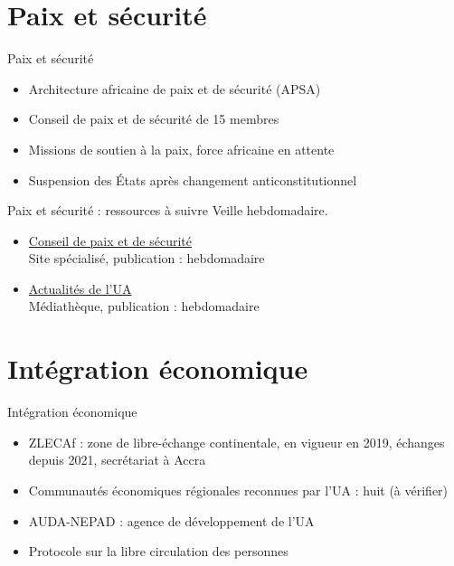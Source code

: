 \documentclass[aspectratio=169,11pt]{beamer}
\begin{document}
\section{Paix et sécurité}
\begin{frame}{Paix et sécurité}
\begin{itemize}
\item Architecture africaine de paix et de sécurité (APSA)
\item Conseil de paix et de sécurité de 15 membres
\item Missions de soutien à la paix, force africaine en attente
\item Suspension des États après changement anticonstitutionnel
\end{itemize}
\end{frame}

\begin{frame}{Paix et sécurité : ressources à suivre}
\small
Veille hebdomadaire.
\begin{itemize}
\item \href{https://www.peaceau.org}{Conseil de paix et de sécurité}\\{\footnotesize Site spécialisé, publication : hebdomadaire}
\item \href{https://au.int/en/pressreleases}{Actualités de l'UA}\\{\footnotesize Médiathèque, publication : hebdomadaire}
\end{itemize}
\end{frame}

\section{Intégration économique}
\begin{frame}{Intégration économique}
\begin{itemize}
\item ZLECAf : zone de libre-échange continentale, en vigueur en 2019, échanges depuis 2021, secrétariat à Accra
\item Communautés économiques régionales reconnues par l'UA : huit (à vérifier)
\item AUDA-NEPAD : agence de développement de l'UA
\item Protocole sur la libre circulation des personnes
\end{itemize}
\end{frame}
\end{document}
